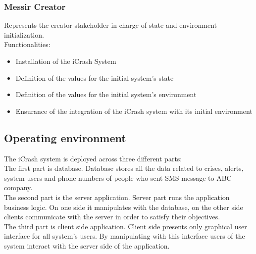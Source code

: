 \subsubsection{Messir Creator}
Represents the creator stakeholder in charge of state and environment
initialization.\\
Functionalities:
\begin{itemize}
  \item Installation of the iCrash System
  \item Definition of the values for the initial system’s state
  \item Definition of the values for the initial system’s environment
  \item Ensurance of  the integration of the iCrash system with its initial
  environment
\end{itemize}

\subsection{Operating environment}
The iCrash system is deployed across three different parts:\\
The first part is database. Database stores all the data related to crises,
alerts, system users and phone numbers of people who sent SMS message to ABC
company.\\
The second part is the server application. Server part runs the application
business logic. On one side it manipulates with the database, on the other side
clients communicate with the server in order to satisfy their objectives.\\
The third part is client side application. Client side presents only graphical
user interface for all system’s users. By manipulating with this interface users
of the system interact with the server side of the application.

